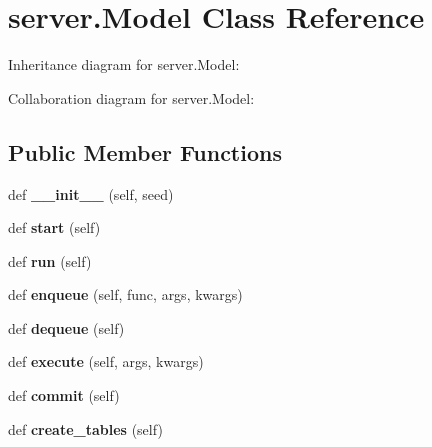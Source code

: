 \hypertarget{classserver_1_1Model}{}\section{server.\+Model Class Reference}
\label{classserver_1_1Model}


Inheritance diagram for server.\+Model\+:


Collaboration diagram for server.\+Model\+:
\subsection*{Public Member Functions}
\begin{DoxyCompactItemize}
\item 
\mbox{\label{classserver_1_1Model_a9a37ce5d48d65d1f73e3310dd540b5cd}} 
def {\bfseries \+\_\+\+\_\+init\+\_\+\+\_\+} (self, seed)
\item 
\mbox{\label{classserver_1_1Model_a24d947d23fffd4f1fa2adffdffa7ad46}} 
def {\bfseries start} (self)
\item 
\mbox{\label{classserver_1_1Model_a6ea5ba19abb493d10867d27edba9bb82}} 
def {\bfseries run} (self)
\item 
\mbox{\label{classserver_1_1Model_ad7c1d2bbcaeeac1f11fae27cbc1c41a9}} 
def {\bfseries enqueue} (self, func, args, kwargs)
\item 
\mbox{\label{classserver_1_1Model_ad0103204c6bad7d0409368d426e971fb}} 
def {\bfseries dequeue} (self)
\item 
\mbox{\label{classserver_1_1Model_a6e4ebd2b163e23db6ceb366b424b0513}} 
def {\bfseries execute} (self, args, kwargs)
\item 
\mbox{\label{classserver_1_1Model_ab427a4018c7e7144f0d7dedfe7e87957}} 
def {\bfseries commit} (self)
\item 
\mbox{\label{classserver_1_1Model_a010bcdc35e6520fc20eaad27781960d6}} 
def {\bfseries create\+\_\+tables} (self)
\item 

\end{DoxyCompactItemize}

